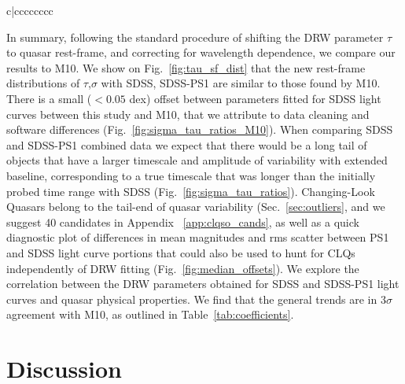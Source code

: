 \documentclass[twocolumn]{aastex62}
\begin{document}
\begin{deluxetable*}{c|cccccccc}
	\enddata
\end{deluxetable*}


In summary, following the standard procedure of shifting the DRW parameter $\tau$ to quasar rest-frame, and correcting for wavelength dependence, we compare our results to M10. We show on  Fig.~\ref{fig:tau_sf_dist} that the new rest-frame distributions of $\tau$,$\sigma$ with SDSS, SDSS-PS1 are similar to those found by M10. There is a small ($<0.05$ dex) offset between parameters fitted for SDSS light curves between this study and M10, that we attribute to data cleaning and software differences (Fig.~\ref{fig:sigma_tau_ratios_M10}). When comparing SDSS and SDSS-PS1 combined data we expect that there would be a long tail of objects that have a larger timescale and amplitude of variability with extended baseline, corresponding to a true timescale that was longer than the initially probed time range with SDSS (Fig.~\ref{fig:sigma_tau_ratios}). Changing-Look Quasars belong to the tail-end of quasar variability (Sec.~\ref{sec:outliers}, and we suggest 40 candidates in Appendix ~\ref{app:clqso_cands}, as well as a quick diagnostic plot of differences in mean magnitudes and rms scatter between PS1 and SDSS light curve portions that could also be used to hunt for CLQs independently of DRW fitting (Fig.~\ref{fig:median_offsets}). We explore the correlation between the DRW parameters obtained for SDSS and SDSS-PS1 light curves and quasar physical properties. We find that the general trends are in $3\sigma$ agreement with M10, as outlined in Table~\ref{tab:coefficients}.

%
%
%
%
%
%
%
%
%
\section{Discussion}
\label{sec:discussion}
\end{document}

